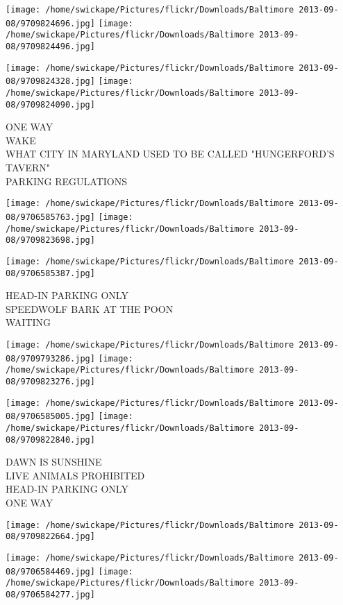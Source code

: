 \documentclass[10pt,letterpaper]{article}
\begin{document}
\texttt{[image: /home/swickape/Pictures/flickr/Downloads/Baltimore 2013-09-08/9709824696.jpg]}
\texttt{[image: /home/swickape/Pictures/flickr/Downloads/Baltimore 2013-09-08/9709824496.jpg]}

\texttt{[image: /home/swickape/Pictures/flickr/Downloads/Baltimore 2013-09-08/9709824328.jpg]}
\texttt{[image: /home/swickape/Pictures/flickr/Downloads/Baltimore 2013-09-08/9709824090.jpg]}

ONE WAY\\
WAKE\\
WHAT CITY IN MARYLAND USED TO BE CALLED "HUNGERFORD'S TAVERN"\\
PARKING REGULATIONS
\pagebreak

\texttt{[image: /home/swickape/Pictures/flickr/Downloads/Baltimore 2013-09-08/9706585763.jpg]}
\texttt{[image: /home/swickape/Pictures/flickr/Downloads/Baltimore 2013-09-08/9709823698.jpg]}

\vspace{0.25in}
\texttt{[image: /home/swickape/Pictures/flickr/Downloads/Baltimore 2013-09-08/9706585387.jpg]}

HEAD{-}IN PARKING ONLY\\
SPEEDWOLF BARK AT THE POON\\
WAITING
\pagebreak

\texttt{[image: /home/swickape/Pictures/flickr/Downloads/Baltimore 2013-09-08/9709793286.jpg]}
\texttt{[image: /home/swickape/Pictures/flickr/Downloads/Baltimore 2013-09-08/9709823276.jpg]}

\texttt{[image: /home/swickape/Pictures/flickr/Downloads/Baltimore 2013-09-08/9706585005.jpg]}
\texttt{[image: /home/swickape/Pictures/flickr/Downloads/Baltimore 2013-09-08/9709822840.jpg]}

DAWN IS SUNSHINE\\
LIVE ANIMALS PROHIBITED\\
HEAD{-}IN PARKING ONLY\\
ONE WAY
\pagebreak

\texttt{[image: /home/swickape/Pictures/flickr/Downloads/Baltimore 2013-09-08/9709822664.jpg]}

\vspace{0.25in}
\texttt{[image: /home/swickape/Pictures/flickr/Downloads/Baltimore 2013-09-08/9706584469.jpg]}
\texttt{[image: /home/swickape/Pictures/flickr/Downloads/Baltimore 2013-09-08/9706584277.jpg]}
\end{document}
